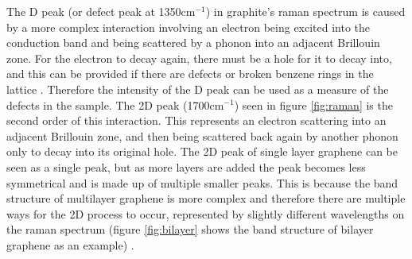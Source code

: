 \documentclass[12pt,titlepage]{article}
\begin{document}
	The D peak (or defect peak at 1350cm$^{-1}$) in graphite's raman spectrum is caused by a more complex interaction involving an electron being excited into the conduction band and being scattered by a phonon into an adjacent Brillouin zone. For the electron to decay again, there must be a hole for it to decay into, and this can be provided if there are defects or broken benzene rings in the lattice \cite{Casiraghi2008,Casiraghi2007a}. Therefore the intensity of the D peak can be used as a measure of the defects in the sample. The 2D peak (1700cm$^{-1}$) seen in figure \ref{fig:raman} is the second order of this interaction. This represents an electron scattering into an adjacent Brillouin zone, and then being scattered back again by another phonon only to decay into its original hole. The 2D peak of single layer graphene can be seen as a single peak, but as more layers are added the peak becomes less symmetrical and is made up of multiple smaller peaks. This is because the band structure of multilayer graphene is more complex and therefore there are multiple ways for the 2D process to occur, represented by slightly different wavelengths on the raman spectrum (figure \ref{fig:bilayer} shows the band structure of bilayer graphene as an example) \cite{Ferrari2006,Ferrari2007,Vidano1981}.
	
\end{document}
